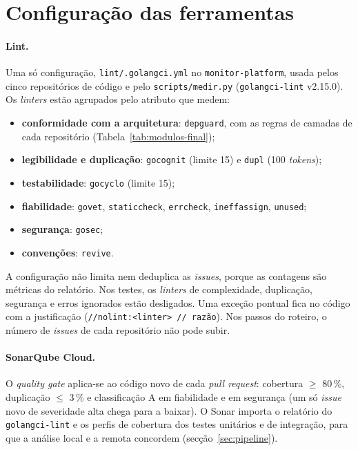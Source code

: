 \section{Configuração das ferramentas}
\label{anx:configuracao}

\paragraph{Lint.}
Uma só configuração, \texttt{lint/.golangci.yml} no \texttt{monitor-platform}, usada pelos cinco repositórios
de código e pelo \texttt{scripts/medir.py} (\texttt{golangci-lint} v2.15.0). Os \emph{linters} estão agrupados pelo
atributo que medem:
\begin{itemize}
\item \textbf{conformidade com a arquitetura}: \texttt{depguard}, com as regras de camadas de cada repositório
(Tabela~\ref{tab:modulos-final});
\item \textbf{legibilidade e duplicação}: \texttt{gocognit} (limite 15) e \texttt{dupl} (100 \emph{tokens});
\item \textbf{testabilidade}: \texttt{gocyclo} (limite 15);
\item \textbf{fiabilidade}: \texttt{govet}, \texttt{staticcheck}, \texttt{errcheck}, \texttt{ineffassign},
\texttt{unused};
\item \textbf{segurança}: \texttt{gosec};
\item \textbf{convenções}: \texttt{revive}.
\end{itemize}
A configuração não limita nem deduplica as \emph{issues}, porque as contagens são métricas do relatório. Nos
testes, os \emph{linters} de complexidade, duplicação, segurança e erros ignorados estão desligados. Uma exceção pontual fica
no código com a justificação (\texttt{//nolint:<linter> // razão}). Nos passos do roteiro, o número de
\emph{issues} de cada repositório não pode subir.

\paragraph{SonarQube Cloud.}
O \emph{quality gate} aplica-se ao código novo de cada \emph{pull request}: cobertura $\ge$ 80\,\%, duplicação
$\le$ 3\,\% e classificação A em fiabilidade e em segurança (um só \emph{issue} novo de severidade alta
chega para a baixar). O Sonar importa o relatório do
\texttt{golangci-lint} e os perfis de cobertura dos testes unitários e de integração, para que a análise local e
a remota concordem (secção~\ref{sec:pipeline}).

